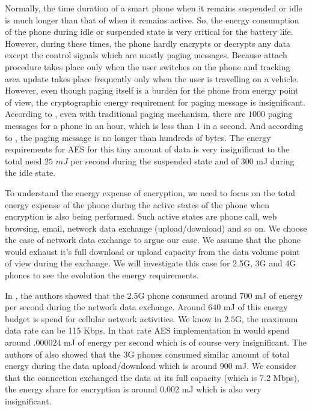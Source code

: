 Normally, the time duration of a smart phone when it remains suspended or idle is much longer than that of when it remains active. So, the energy consumption of the phone during idle or suspended state is very critical for the battery life. However, during these times, the phone hardly encrypts or decrypts any data except the control signals which are mostly paging messages. Because attach procedure takes place only when the user switches on the phone and tracking area update takes place frequently only when the user is travelling on a vehicle. However, even though paging itself is a burden for the phone from energy point of view, the cryptographic energy requirement for paging message is insignificant. According to \cite{Nokia_2013}, even with traditional paging mechanism, there are $1000$ paging messages for a phone in an hour, which is less than $1$ in a second. And according to \cite{3GPP_TS_36_331}, the paging message is no longer than hundreds of bytes. The energy requirements for AES for this tiny amount of data is very insignificant to the total need $25$ $mJ$ per second during the suspended state and of 300 mJ during the idle state.

To understand the energy expense of encryption, we need to focus on the total energy expense of the phone during the active states of the phone when encryption is also being performed. Such active states are phone call, web browsing, email, network data exchange (upload/download) and so on. We choose the case of network data exchange to argue our case. We assume that the phone would exhaust it's full download or upload capacity from the data volume point of view during the exchange. We will investigate this case for 2.5G, 3G and 4G phones to see the evolution the energy requirements.

In \cite{Usenix_2010}, the authors showed that the $2.5$G phone consumed around $700$ mJ of energy per second during the network data exchange. Around $640$ mJ of this energy budget is spend for cellular network activities. We know in $2.5$G, the maximum data rate can be 115 Kbps. In that rate AES implementation in \cite{Ruhr_2011} would spend around $.000024$ mJ of energy per second which is of course very insignificant. The authors of \cite{Usenix_2010} also showed that the 3G phones consumed similar amount of total energy during the data upload/download which is around $900$ mJ. We consider that the connection exchanged the data at its full capacity (which is 7.2 Mbps), the energy share for encryption is around $0.002$ mJ which is also very insignificant. 

